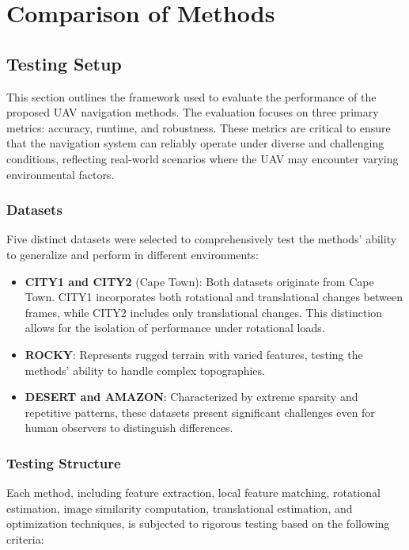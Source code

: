 \chapter{Comparison of Methods}



\section{Testing Setup}

This section outlines the framework used to evaluate the performance of the proposed UAV navigation methods. The evaluation focuses on three primary metrics: accuracy, runtime, and robustness. These metrics are critical to ensure that the navigation system can reliably operate under diverse and challenging conditions, reflecting real-world scenarios where the UAV may encounter varying environmental factors.

\subsection{Datasets}

Five distinct datasets were selected to comprehensively test the methods' ability to generalize and perform in different environments:

\begin{itemize}
    \item \textbf{CITY1 and CITY2} (Cape Town): Both datasets originate from Cape Town. CITY1 incorporates both rotational and translational changes between frames, while CITY2 includes only translational changes. This distinction allows for the isolation of performance under rotational loads.
    \item \textbf{ROCKY}: Represents rugged terrain with varied features, testing the methods' ability to handle complex topographies.
    \item \textbf{DESERT and AMAZON}: Characterized by extreme sparsity and repetitive patterns, these datasets present significant challenges even for human observers to distinguish differences.
\end{itemize}


\subsection{Testing Structure}

Each method, including feature extraction, local feature matching, rotational estimation, image similarity computation, translational estimation, and optimization techniques, is subjected to rigorous testing based on the following criteria:


